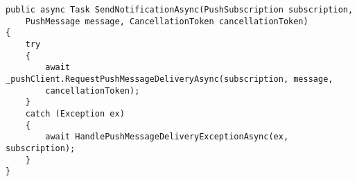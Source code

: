 \begin{minipage}
    \begin{lstlisting}[caption={Code snippet of a push notification implementation.}, label={pushoverpollcode}]
public async Task SendNotificationAsync(PushSubscription subscription, 
    PushMessage message, CancellationToken cancellationToken)
{
    try
    {
        await _pushClient.RequestPushMessageDeliveryAsync(subscription, message, 
        cancellationToken);
    }
    catch (Exception ex)
    {
        await HandlePushMessageDeliveryExceptionAsync(ex, subscription);
    }
}
    \end{lstlisting}
\end{minipage}